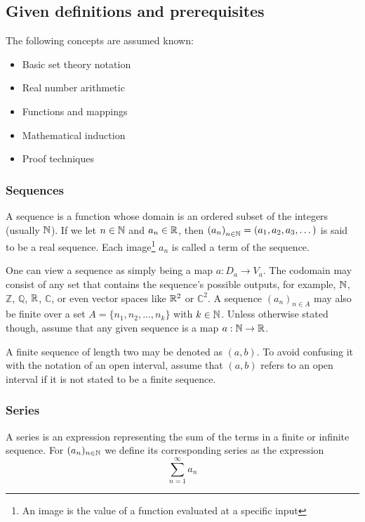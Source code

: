 \subsection{Given definitions and prerequisites}

The following concepts are assumed known:
\begin{itemize}
    \item Basic set theory notation
    \item Real number arithmetic
    \item Functions and mappings
    \item Mathematical induction
    \item Proof techniques
\end{itemize}

\subsubsection{Sequences}
A sequence is a function whose domain is an ordered subset of the integers (usually \(\mathbb{N}\)). If we let \(n \in \mathbb{N}\) and \(a_n \in \mathbb{R}\), then \(\left(a_n\right)_{n\in\mathbb{N}} = (a_1, a_2, a_3, \dots)\) is said to be a real sequence. Each image\footnote{An image is the value of a function evaluated at a specific input} \(a_n\) is called a term of the sequence.

One can view a sequence as simply being a map \(a : D_a \to V_a\). The codomain may consist of any set that contains the sequence's possible outputs, for example, \(\mathbb{N}\), \(\mathbb{Z}\), \(\mathbb{Q}\), \(\mathbb{R}\), \(\mathbb{C}\), or even vector spaces like \(\mathbb{R}^2\) or \(\mathbb{C}^2\). A sequence \((a_n)_{n \in A}\) may also be finite over a set \(A = \{n_1, n_2, \dots, n_k\}\) with \(k \in \mathbb{N}\). Unless otherwise stated though, assume that any given sequence is a map \(a : \mathbb{N} \to \mathbb{R}\).

A finite sequence of length two may be denoted as \((a, b)\). To avoid confusing it with the notation of an open interval, assume that \((a, b)\) refers to an open interval if it is not stated to be a finite sequence.

\subsubsection{Series}
A series is an expression representing the sum of the terms in a finite or infinite sequence. For \((a_n)_{n \in \mathbb{N}}\) we define its corresponding series as the expression
\begin{equation}
    \sum_{n=1}^{\infty}a_n
\end{equation}

